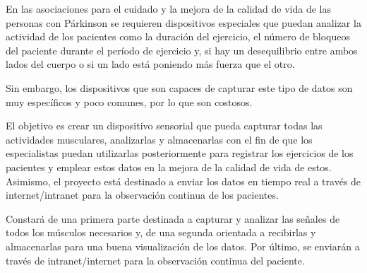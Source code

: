 


En las asociaciones para el cuidado y la mejora de la calidad de vida de las personas con Párkinson se requieren dispositivos especiales que puedan analizar la actividad de los pacientes como la duración del ejercicio, el número de bloqueos del paciente durante el período de ejercicio y, si hay un desequilibrio entre ambos lados del cuerpo o si un lado está poniendo más fuerza que el otro.

Sin embargo, los dispositivos que son capaces de capturar este tipo de datos son muy específicos y poco comunes, por lo que son costosos.

El objetivo es crear un dispositivo sensorial que pueda capturar todas las actividades musculares, analizarlas y almacenarlas con el fin de que los especialistas puedan utilizarlas posteriormente para registrar los ejercicios de los pacientes y emplear estos datos en la mejora de la calidad de vida de estos. Asimismo, el proyecto está destinado a enviar los datos en tiempo real a través de internet/intranet para la observación continua de los pacientes.

Constará de una primera parte destinada a capturar y analizar las señales de todos los músculos necesarios y, de una segunda orientada a recibirlas y almacenarlas para una buena visualización de los datos. Por último, se enviarán a través de intranet/internet para la observación continua del paciente. 









